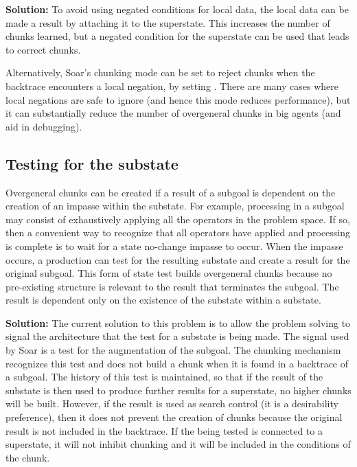 \textbf{Solution:} To avoid using negated conditions for local data, the local
data can be made a result by attaching it to the superstate. This increases
the number of chunks learned, but a negated condition for the superstate can
be used that leads to correct chunks.

Alternatively, Soar's chunking mode can be set to reject chunks when the
backtrace encounters a local negation, by setting . There are many cases where local negations
are safe to ignore (and hence this mode reduces performance), but it can
substantially reduce the number of overgeneral chunks in big agents (and aid in
debugging).

\subsection{Testing for the substate}

Overgeneral chunks can be created if a result of a subgoal is dependent on the
creation of an impasse within the substate. For example, processing in a
subgoal may consist of exhaustively applying all the operators in the problem
space. If so, then a convenient way to recognize that all operators have
applied and processing is complete is to wait for a state no-change impasse to
occur. When the impasse occurs, a production can test for the resulting
substate and create a result for the original subgoal. This form of state test
builds overgeneral chunks because no pre-existing structure is relevant to the
result that terminates the subgoal. The result is dependent only on the
existence of the substate within a substate.

\textbf{Solution:} The current solution to this problem is to allow the
problem solving to signal the architecture that the test for a substate is
being made.  The signal used by Soar is a test for the  augmentation of the subgoal.  The chunking mechanism recognizes this test
and does not build a chunk when it is found in a backtrace of a subgoal.  The
history of this test is maintained, so that if the result of the substate is
then used to produce further results for a superstate, no higher chunks will
be built.  However, if the result is used as search control (it is a
desirability preference), then it does not prevent the creation of chunks
because the original result is not included in the backtrace.  If the
 being tested is connected to a superstate, it will
not inhibit chunking and it will be included in the conditions of the chunk.


